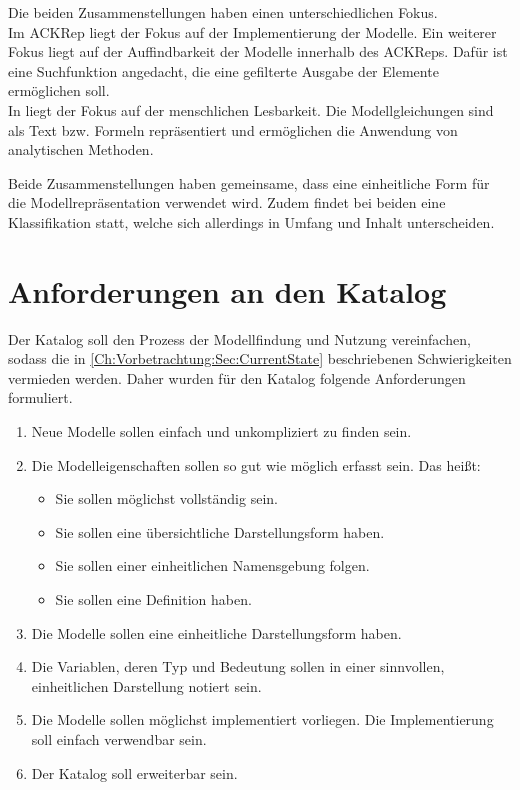 Die beiden Zusammenstellungen haben einen unterschiedlichen Fokus.\\
Im ACKRep liegt der Fokus auf der Implementierung der Modelle. Ein weiterer Fokus liegt auf der Auffindbarkeit der Modelle innerhalb des ACKReps. Dafür ist eine Suchfunktion angedacht, die eine gefilterte Ausgabe der Elemente ermöglichen soll.\\
In \cite{LIYU13} liegt der Fokus auf der menschlichen Lesbarkeit. Die Modellgleichungen sind als Text bzw. Formeln repräsentiert und ermöglichen die Anwendung von analytischen Methoden. 

Beide Zusammenstellungen haben gemeinsame, dass eine einheitliche Form für die Modellrepräsentation verwendet wird. Zudem findet bei beiden eine Klassifikation statt, welche sich allerdings in Umfang und Inhalt unterscheiden.

\section{Anforderungen an den Katalog} 
\label{Ch:Vorbetrachtung:Sec:Anforderungen}

Der Katalog soll den Prozess der Modellfindung und Nutzung vereinfachen, sodass die in \autoref{Ch:Vorbetrachtung:Sec:CurrentState} beschriebenen Schwierigkeiten vermieden werden. Daher wurden für den Katalog folgende Anforderungen formuliert.
\begin{enumerate}[label=\textbf{Anforderung A.\arabic*}:, ref=\textbf{A.\arabic*}, wide=0pt, leftmargin=*]
	\item \label{A.Findbarkeit}Neue Modelle sollen einfach und unkompliziert zu finden sein.
	\item \label{A.Modelleigenschaften}Die Modelleigenschaften sollen so gut wie möglich erfasst sein. Das heißt:
	\begin{itemize}[label=$\bullet$]
		\item Sie sollen möglichst vollständig sein.
		\item Sie sollen eine übersichtliche Darstellungsform haben.
		\item Sie sollen einer einheitlichen Namensgebung folgen.
		\item Sie sollen eine Definition haben.
	\end{itemize}
	\item \label{A.Darstellung_Gleichungen}Die Modelle sollen eine einheitliche Darstellungsform haben.
	\item \label{A.Darstellung_Variablen}Die Variablen, deren Typ und Bedeutung sollen in einer sinnvollen, einheitlichen Darstellung notiert sein.
	\item \label{A.Implementierung}Die Modelle sollen möglichst implementiert vorliegen. Die Implementierung soll einfach verwendbar sein.
	\item \label{A.Erweiterbarkeit}Der Katalog soll erweiterbar sein. %
\end{enumerate}

